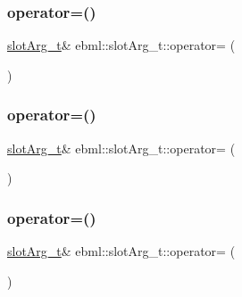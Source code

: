 \mbox{\label{classebml_1_1slotArg__t_aeff50ae008a8002833d3baa52f22fd17}} 
\subsubsection{\texorpdfstring{operator=()}{operator=()}\hspace{0.1cm}{\footnotesize\ttfamily [2/6]}}
{\footnotesize\ttfamily \mbox{\hyperlink{classebml_1_1slotArg__t}{slot\+Arg\+\_\+t}}\& ebml\+::slot\+Arg\+\_\+t\+::operator= (\begin{DoxyParamCaption}\item[{\mbox{\hyperlink{classebml_1_1slotArg__t}{slot\+Arg\+\_\+t}} \&\&}]{ }\end{DoxyParamCaption})}

\mbox{\label{classebml_1_1slotArg__t_a01e1399671dde26089dfd42528357de5}} 
\subsubsection{\texorpdfstring{operator=()}{operator=()}\hspace{0.1cm}{\footnotesize\ttfamily [3/6]}}
{\footnotesize\ttfamily \mbox{\hyperlink{classebml_1_1slotArg__t}{slot\+Arg\+\_\+t}}\& ebml\+::slot\+Arg\+\_\+t\+::operator= (\begin{DoxyParamCaption}\item[{const \mbox{\hyperlink{namespaceebml_adad533b7705a16bb360fe56380c5e7be}{ebml\+Element\+\_\+sp}} \&}]{ }\end{DoxyParamCaption})}

\mbox{\label{classebml_1_1slotArg__t_a9f8040d5b36f81615059a9a8d41739de}} 
\subsubsection{\texorpdfstring{operator=()}{operator=()}\hspace{0.1cm}{\footnotesize\ttfamily [4/6]}}
{\footnotesize\ttfamily \mbox{\hyperlink{classebml_1_1slotArg__t}{slot\+Arg\+\_\+t}}\& ebml\+::slot\+Arg\+\_\+t\+::operator= (\begin{DoxyParamCaption}\item[{\mbox{\hyperlink{namespaceebml_adad533b7705a16bb360fe56380c5e7be}{ebml\+Element\+\_\+sp}} \&\&}]{ }\end{DoxyParamCaption})}


